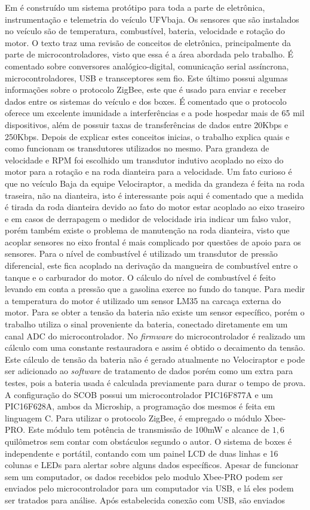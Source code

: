 Em  é construído um sistema protótipo para toda a parte de eletrônica, instrumentação e telemetria do veículo UFVbaja. Os sensores que são instalados no veículo são de temperatura, combustível, bateria, velocidade e rotação do motor. O texto traz uma revisão de conceitos de eletrônica, principalmente da parte de microcontroladores, visto que essa é a área abordada pelo trabalho. É comentado sobre conversores analógico-digital, comunicação serial assíncrona, microcontroladores, USB e transceptores sem fio. Este último possui algumas informações sobre o protocolo ZigBee, este que é usado para enviar e receber dados entre os sistemas do veículo e dos boxes. É comentado que o protocolo oferece um excelente imunidade a interferências e a pode hospedar mais de 65 mil dispositivos, além de possuir taxas de transferências de dados entre 20Kbps e 250Kbps. Depois de explicar estes conceitos inicias, o trabalho explica quais e como funcionam os transdutores utilizados no mesmo. Para grandeza de velocidade e RPM foi escolhido um transdutor indutivo acoplado no eixo do motor para a rotação e na roda dianteira para a velocidade. Um fato curioso é que no veículo Baja da equipe Velociraptor, a medida da grandeza é feita na roda traseira, não na dianteira, isto é interessante pois aqui é comentado que a medida é tirada da roda dianteira devido ao fato do motor estar acoplado ao eixo traseiro e em casos de derrapagem o medidor de velocidade iria indicar um falso valor, porém também existe o problema de manutenção na roda dianteira, visto que acoplar sensores no eixo frontal é mais complicado por questões de apoio para os sensores. Para o nível de combustível é utilizado um transdutor de pressão diferencial, este fica acoplado na derivação da mangueira de combustível entre o tanque e o carburador do motor. O cálculo do nível de combustível é feito levando em conta a pressão que a gasolina exerce no fundo do tanque. Para medir a temperatura do motor é utilizado um sensor LM35 na carcaça externa do motor. Para se obter a tensão da bateria não existe um sensor específico, porém o trabalho utiliza o sinal proveniente da bateria, conectado diretamente em um canal ADC do microcontrolador. No \textit{firmware} do microcontrolador é realizado um cálculo com uma constante restauradora e assim é obtido o decaimento da tensão. Este cálculo de tensão da bateria não é gerado atualmente no Velociraptor e pode ser adicionado ao \textit{software} de tratamento de dados porém como um extra para testes, pois a bateria usada é calculada previamente para durar o tempo de prova. A configuração do SCOB possui um microcontrolador PIC16F877A e um PIC16F628A, ambos da Microship, a programação dos mesmos é feita em linguagem C. Para utilizar o protocolo ZigBee, é empregado o módulo Xbee-PRO. Este módulo tem potência de transmissão de 100mW e alcance de $1,6$ quilômetros sem contar com obstáculos segundo o autor. O sistema de boxes é independente e portátil, contando com um painel LCD de duas linhas e 16 colunas e LEDs para alertar sobre alguns dados específicos. Apesar de funcionar sem um computador, os dados recebidos pelo modulo Xbee-PRO podem ser enviados pelo microcontrolador para um computador via USB, e lá eles podem ser tratados para análise. Após estabelecida conexão com USB, são enviados 